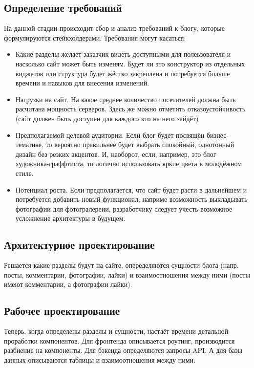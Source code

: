 \documentclass[bibliography=totocnumbered]{scrartcl}
\begin{document}
\subsection{Определение требований}
На данной стадии происходит сбор и анализ требований к блогу, которые формулируются стейкхолдерами. Требования могут касаться:
\begin{itemize}
    \item Какие разделы желает заказчик видеть доступными для полеьзователя и насколько сайт может быть изменям. Будет ли это конструктор из отдельных виджетов или структура будет жёстко закреплена и потребуется больше времени и навыков для внесения изменений.

    \item Нагрузки на сайт. На какое среднее количество посетителей должна быть расчитана мощность серверов. Здесь же можно отметить отказоустойчивость (сайт должен быть доступен для каждого кто на него зайдёт)

    \item Предполагаемой целевой аудитории. Если блог будет посвящён бизнес-тематике, то вероятно правильнее будет выбрать спокойный, однотонный дизайн без резких акцентов. И, наоборот, если, например, это блог художника-граффтиста, то логично использовать яркие цвета в молодёжном стиле.

    \item Потенциал роста. Если предполагается, что сайт будет расти в дальнейшем и потребуется добавить новый функционал, наприме возможность выкладывать фотографии для фотогралереии, разработчику следует учесть возможное усложнение архитектуры в будущем.
\end{itemize}

\subsection{Архитектурное проектирование}
Решается какие разделы будут на сайте, опеределяются сущности блога (напр. посты, комментарии, фотографии, лайки) и взаимоотношения между ними (посты имеют комментарии, а фотографии лайки).

\subsection{Рабочее проектирование}
Теперь, когда определены разделы и сущности, настаёт времени детальной проработки компонентов. Для фронтенда описывается роутинг, производится разбиение на компоненты. Для бэкенда определяются запросы API. А для базы данных описываются таблицы и взаимоотношения между ними.
\end{document}
